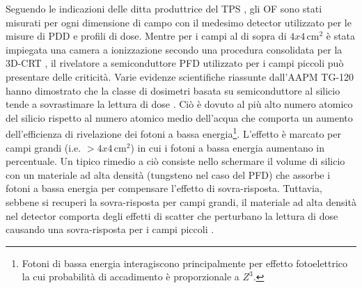 Seguendo le indicazioni delle ditta produttrice del TPS \cite{RaySearchLaboratories2014}, gli OF sono stati misurati per ogni dimensione di campo con il medesimo detector utilizzato per le misure di PDD e profili di dose. Mentre per i campi al di sopra di $4x4\,$cm$^2$ è stata impiegata una camera a ionizzazione secondo una procedura consolidata per la 3D-CRT \cite{Andreo2006}, il rivelatore a semiconduttore PFD utilizzato per i campi piccoli può presentare delle criticità. Varie evidenze scientifiche riassunte dall'AAPM TG-120 \cite{Low2011} hanno dimostrato che la classe di dosimetri basata su semiconduttore al silicio tende a sovrastimare la lettura di dose \cite{Low2011}. Ciò è dovuto al più alto numero atomico del silicio rispetto al numero atomico medio dell'acqua che comporta un aumento dell'efficienza di rivelazione dei fotoni a bassa energia\footnote{Fotoni di bassa energia interagiscono principalmente per effetto fotoelettrico la cui probabilità di accadimento è proporzionale a $Z^3$.}. L'effetto è marcato per campi grandi (i.e. $> 4x4\,$cm$^2$) in cui i fotoni a bassa energia aumentano in percentuale. Un tipico rimedio a ciò consiste nello schermare il volume di silicio con un materiale ad alta densità (tungsteno nel caso del PFD) che assorbe i fotoni a bassa energia per compensare l'effetto di sovra-risposta. Tuttavia, sebbene si recuperi la sovra-risposta per campi grandi, il materiale ad alta densità nel detector comporta degli effetti di scatter che perturbano la lettura di dose causando una sovra-risposta per i campi piccoli \cite{Griessbach2005}.

